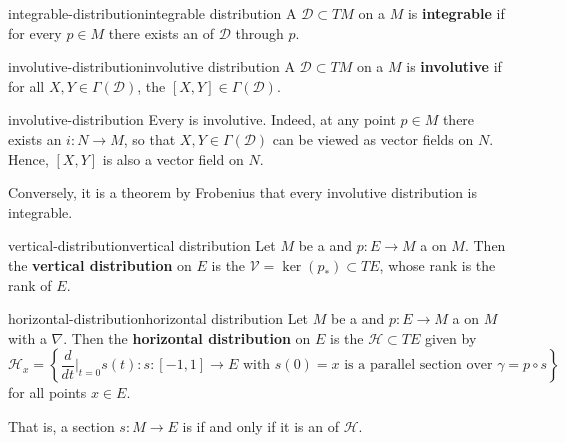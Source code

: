 \begin{topic}{integrable-distribution}{integrable distribution}
    A  $\mathcal{D} \subset TM$ on a  $M$ is \textbf{integrable} if for every $p \in M$ there exists an  of $\mathcal{D}$ through $p$.
\end{topic}

\begin{topic}{involutive-distribution}{involutive distribution}
    A  $\mathcal{D} \subset TM$ on a  $M$ is \textbf{involutive} if for all $X, Y \in \Gamma(\mathcal{D})$, the  $[X, Y] \in \Gamma(\mathcal{D})$.
\end{topic}

\begin{example}{involutive-distribution}
    Every  is involutive. Indeed, at any point $p \in M$ there exists an  $i \colon N \to M$, so that $X, Y \in \Gamma(\mathcal{D})$ can be viewed as vector fields on $N$. Hence, $[X, Y]$ is also a vector field on $N$.
    
    Conversely, it is a theorem by Frobenius that every involutive distribution is integrable.
\end{example}

\begin{topic}{vertical-distribution}{vertical distribution}
    Let $M$ be a  and $p \colon E \to M$ a  on $M$. Then the \textbf{vertical distribution} on $E$ is the  $\mathcal{V} = \ker(p_*) \subset TE$, whose rank is the rank of $E$.
\end{topic}

\begin{topic}{horizontal-distribution}{horizontal distribution}
    Let $M$ be a  and $p \colon E \to M$ a  on $M$ with a  $\nabla$. Then the \textbf{horizontal distribution} on $E$ is the  $\mathcal{H} \subset TE$ given by
    \[ \mathcal{H}_x = \left\{ \frac{d}{dt}\Big|_{t = 0} s(t) \colon s \colon [-1, 1] \to E \text{ with } s(0) = x \text{ is a parallel section over } \gamma = p \circ s \right\} \]
    for all points $x \in E$.
    
    That is, a section $s \colon M \to E$ is  if and only if it is an  of $\mathcal{H}$.
\end{topic}

